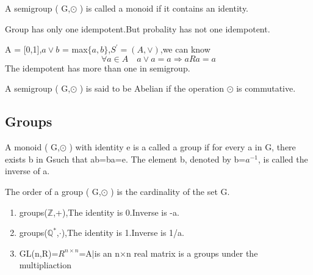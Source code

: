 \documentclass[cn,10pt,math=newtx,citestyle=gb7714-2015,bibstyle=gb7714-2015]{elegantbook}
\begin{document}
\begin{definition}
    A semigroup ( G,$\odot$ )  is called a monoid if it contains an identity.
\end{definition}
\begin{remark}
    Group has only one idempotent.But probality has not one idempotent.
    \begin{example}
        A = [0,1],$a\lor b$ = max$\{a,b\}$,$S^{'}= (A,\lor)$,we can know\begin{equation*}
            \forall a \in A \quad a\lor a = a \Rightarrow aRa = a 
        \end{equation*}
        The idempotent has more than one in semigroup.
    \end{example}
\end{remark}

\begin{definition}
    A semigroup ( G,$\odot$ ) is said to be Abelian if the operation $\odot$  is commutative.
\end{definition}


\subsection{Groups}
\begin{definition}
    A monoid ( G,$\odot$ ) with identity e is a called a group if for every a in G, there exists b in Gsuch that ab=ba=e. The element b, denoted by b=$a^{-1}$, is called the inverse of a.
\end{definition}

\begin{definition}
    The order of a group ( G,$\odot$  ) is the cardinality of the set G.
\end{definition}

\begin{example}
    \begin{enumerate}
        \item groups($\mathbb{Z}$,+),The identity is 0.Inverse is -a.
        \item groups($\mathbb{Q}^*$,$\cdot$),The identity is 1.Inverse is 1/a.
        \item GL(n,R)=$R^{n\times n}$={A$|$is an n$\times$n real matrix} is a groups under the multipliaction
    \end{enumerate}
\end{example}
\end{document}

